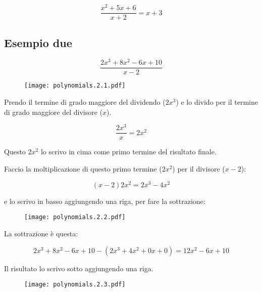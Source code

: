 \begin{equation}
\frac{x^2+5x+6}
{x+2} = x+3
\end{equation}

\begin{minipage}{\textwidth}
\subsection{Esempio due}

\setcounter{equation}{0}

\begin{equation}
\frac{2x^3+8x^2-6x+10}{x-2}
\end{equation}


\begin{figure}[H]
\centering
\texttt{[image: polynomials.2.1.pdf]}
\end{figure}

Prendo il termine di grado maggiore del dividendo ($2x^3$) e lo divido per il termine di grado maggiore del divisore ($x$).

\begin{equation}
\frac{2x^3}
{x} = 2x^2
\end{equation}

Questo $2x^2$ lo scrivo in cima come primo termine del risultato finale.

Faccio la moltiplicazione di questo primo termine ($2x^2$) per il divisore ($x-2$):

\begin{equation}
(x-2)2x^2 = 2x^3-4x^2
\end{equation}

e lo scrivo in basso aggiungendo una riga, per fare la sottrazione:

\begin{figure}[H]
\centering
\texttt{[image: polynomials.2.2.pdf]}
\end{figure}

\end{minipage}

La sottrazione è questa:

\begin{equation}
2x^3+8x^2-6x+10 - (  2x^3+4x^2+0x+0 )= 12x^2-6x+10
\end{equation}

Il risultato lo scrivo sotto aggiungendo una riga.

\begin{figure}[H]
\centering
\texttt{[image: polynomials.2.3.pdf]}
\end{figure}


